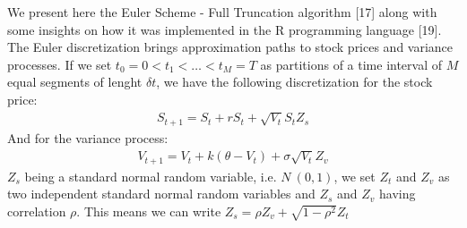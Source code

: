 \documentclass[12pt,twoside]{reedthesis}
\theoremstyle{definition}
\theoremstyle{definition}
\theoremstyle{remark}
\begin{document}
  We present here the Euler Scheme - Full Truncation algorithm {[}17{]}
  along with some insights on how it was implemented in the R programming
  language {[}19{]}. The Euler discretization brings approximation paths
  to stock prices and variance processes. If we set
  \(t_0 = 0 < t_1 < \dots < t_M = T\) as partitions of a time interval of
  \(M\) equal segments of lenght \(\delta t\), we have the following
  discretization for the stock price:
  \begin{align}
  S_{t+1} = S_t + rS_t + \sqrt{V_t} S_t Z_s
  \end{align}
  \noindent
  And for the variance process:
  \begin{align}
  V_{t+1} = V_t + k (\theta - V_t) + \sigma \sqrt{V_t} Z_v
  \end{align}
  \noindent
  \(Z_s\) being a standard normal random variable, i.e. \(N~(0,1)\), we
  set \(Z_t\) and \(Z_v\) as two independent standard normal random
  variables and \(Z_s\) and \(Z_v\) having correlation \(\rho\). This
  means we can write \(Z_s = \rho Z_v + \sqrt{1-\rho^2} Z_t\)
  
\end{document}
